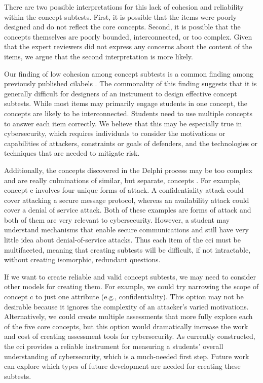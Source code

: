 There are two possible interpretations for this lack of cohesion and reliability within the concept subtests. First, it is possible that the items were poorly designed and do not reflect the core concepts. Second, it is possible that the concepts themselves are poorly bounded, interconnected, or too complex. Given that the expert reviewers did not express any concerns about the content of the items, we argue that the second interpretation is more likely. 

Our finding of low cohesion among concept subtests is a common finding among previously published \glspl{cilabel} \cite{jorian}. The commonality of this finding suggests that it is generally difficult for designers of an instrument to design effective concept subtests. While most items may primarily engage students in one concept, the concepts are likely to be interconnected. Students need to use multiple concepts to answer each item correctly. We believe that this may be especially true in cybersecurity, which requires individuals to consider the motivations or capabilities of attackers, constraints or goals of defenders, and the technologies or techniques that are needed to mitigate risk.

Additionally, the concepts discovered in the Delphi process may be too complex and are really culminations of similar, but separate, concepts \cite{delphi}. For example, concept \gls{c} involves four unique forms of attack. A confidentiality attack could cover attacking a secure message protocol, whereas an availability attack could cover a denial of service attack. Both of these examples are forms of attack and both of them are very relevant to cybersecurity. However, a student may understand mechanisms that enable secure communications and still have very little idea about denial-of-service attacks. Thus each item of the \gls{cci} must be multifaceted, meaning that creating subtests will be difficult, if not intractable, without creating isomorphic, redundant questions.


If we want to create reliable and valid concept subtests, we may need to consider other models for creating them. For example, we could try narrowing the scope of concept \gls{c} to just one attribute (e.g., confidentiality). This option may not be desirable because it ignores the complexity of an attacker's varied motivations. Alternatively, we could create multiple assessments that more fully explore each of the five core concepts, but this option would dramatically increase the work and cost of creating assessment tools for cybersecurity. As currently constructed, the \gls{cci} provides a reliable instrument for measuring a students' overall understanding of cybersecurity, which is a much-needed first step. Future work can explore which types of future development are needed for creating these subtests.

